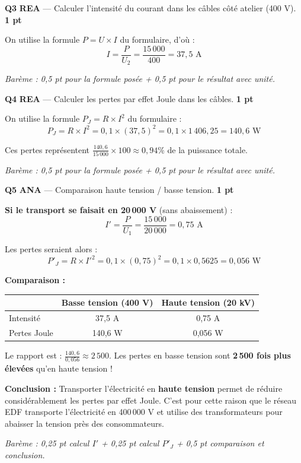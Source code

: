 \documentclass[a4paper,11pt]{article}
\newcommand{\pts}[1]{\hfill\textcolor{gris}{\small\textbf{#1}}}
\newcommand{\comp}[1]{\colorbox{blue!10}{\scriptsize\textbf{#1}}}
\begin{document}
\textbf{Q3} \comp{REA} — Calculer l'intensité du courant dans les câbles côté atelier (400 V). \pts{1 pt}

\begin{corrbox}
On utilise la formule $P = U \times I$ du formulaire, d'où :
\[
I = \frac{P}{U_2} = \frac{15\,000}{400} = \boxed{37{,}5 \text{ A}}
\]

\textit{Barème : 0,5 pt pour la formule posée + 0,5 pt pour le résultat avec unité.}
\end{corrbox}

\textbf{Q4} \comp{REA} — Calculer les pertes par effet Joule dans les câbles. \pts{1 pt}

\begin{corrbox}
On utilise la formule $P_J = R \times I^2$ du formulaire :
\[
P_J = R \times I^2 = 0{,}1 \times (37{,}5)^2 = 0{,}1 \times 1\,406{,}25 = \boxed{140{,}6 \text{ W}}
\]

Ces pertes représentent $\frac{140{,}6}{15\,000} \times 100 \approx 0{,}94\%$ de la puissance totale.

\smallskip
\textit{Barème : 0,5 pt pour la formule posée + 0,5 pt pour le résultat avec unité.}
\end{corrbox}

\textbf{Q5} \comp{ANA} — Comparaison haute tension / basse tension. \pts{1 pt}

\begin{corrbox}
\textbf{Si le transport se faisait en 20\,000 V} (sans abaissement) :
\[
I' = \frac{P}{U_1} = \frac{15\,000}{20\,000} = \boxed{0{,}75 \text{ A}}
\]

Les pertes seraient alors :
\[
P'_J = R \times I'^2 = 0{,}1 \times (0{,}75)^2 = 0{,}1 \times 0{,}5625 = \boxed{0{,}056 \text{ W}}
\]

\textbf{Comparaison :}
\begin{center}
\begin{tabular}{lcc}
\toprule
& \textbf{Basse tension (400 V)} & \textbf{Haute tension (20 kV)} \\
\midrule
Intensité & 37,5 A & 0,75 A \\
Pertes Joule & 140,6 W & 0,056 W \\
\bottomrule
\end{tabular}
\end{center}

Le rapport est : $\frac{140{,}6}{0{,}056} \approx 2\,500$. Les pertes en basse tension sont \textbf{2\,500 fois plus élevées} qu'en haute tension !

\textbf{Conclusion :} Transporter l'électricité en \textbf{haute tension} permet de réduire considérablement les pertes par effet Joule. C'est pour cette raison que le réseau EDF transporte l'électricité en 400\,000 V et utilise des transformateurs pour abaisser la tension près des consommateurs.

\smallskip
\textit{Barème : 0,25 pt calcul $I'$ + 0,25 pt calcul $P'_J$ + 0,5 pt comparaison et conclusion.}
\end{corrbox}
\end{document}
